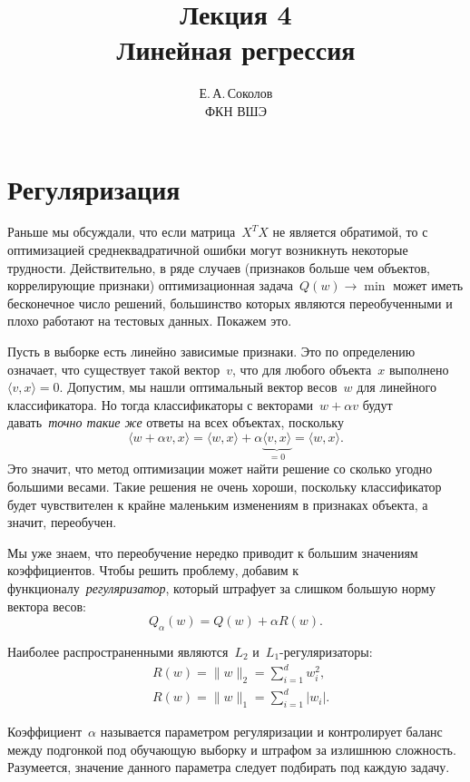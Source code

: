 \documentclass[12pt,fleqn]{article}
\begin{document}
\title{Лекция 4\\Линейная регрессия}
\author{Е.\,А.\,Соколов\\ФКН ВШЭ}
\maketitle

\section{Регуляризация}

Раньше мы обсуждали, что если матрица~$X^T X$ не является обратимой,
то с оптимизацией среднеквадратичной ошибки могут возникнуть некоторые трудности.
Действительно, в ряде случаев (признаков больше чем объектов, коррелирующие признаки)
оптимизационная задача~$Q(w) \to \min$ может иметь бесконечное число решений,
большинство которых являются переобученными и плохо работают на тестовых данных.
Покажем это.

Пусть в выборке есть линейно зависимые признаки.
Это по определению означает, что существует такой вектор~$v$,
что для любого объекта~$x$ выполнено~$\langle v, x \rangle = 0$.
Допустим, мы нашли оптимальный вектор весов~$w$ для линейного классификатора.
Но тогда классификаторы с векторами~$w + \alpha v$ будут давать~\emph{точно такие же}
ответы на всех объектах, поскольку
\[
    \langle w + \alpha v, x \rangle
    =
    \langle w, x \rangle
    +
    \alpha
    \underbrace{
        \langle v, x \rangle
    }_{=0}
    =
    \langle w, x \rangle.
\]
Это значит, что метод оптимизации может найти решение
со сколько угодно большими весами.
Такие решения не очень хороши, поскольку классификатор
будет чувствителен к крайне маленьким изменениям
в признаках объекта, а значит, переобучен.

Мы уже знаем, что переобучение нередко приводит к большим значениям коэффициентов.
Чтобы решить проблему, добавим к функционалу~\emph{регуляризатор},
который штрафует за слишком большую норму вектора весов:
\[
    Q_\alpha(w) = Q(w) + \alpha R(w).
\]

Наиболее распространенными являются~$L_2$ и~$L_1$-регуляризаторы:
\begin{align*}
    &R(w) = \|w\|_2 = \sum_{i = 1}^d w_i^2, \\
    &R(w) = \|w\|_1 = \sum_{i = 1}^d |w_i|.
\end{align*}

Коэффициент~$\alpha$ называется параметром регуляризации и контролирует баланс между
подгонкой под обучающую выборку и штрафом за излишнюю сложность.
Разумеется, значение данного параметра следует подбирать под каждую задачу.
\end{document}
